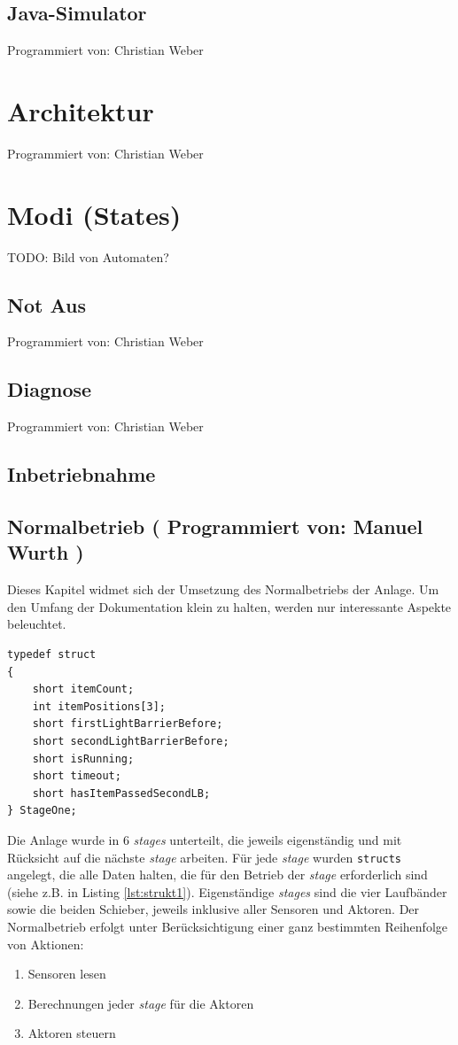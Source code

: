 \documentclass[fontsize=11pt,a4paper,final]{scrartcl}[2003/01/01]
\newcommand*{\manu}{%
	Programmiert von: Manuel Wurth
}
\newcommand*{\chris}{%
	Programmiert von: Christian Weber
}
\begin{document}
\subsection{Java-Simulator}
\chris

\section{Architektur}
\chris
\section{Modi (States)}
TODO: Bild von Automaten?
\subsection{Not Aus}
\chris
\subsection{Diagnose}
\chris

\subsection{Inbetriebnahme}
\subsection{Normalbetrieb (\manu)}
Dieses Kapitel widmet sich der Umsetzung des Normalbetriebs der Anlage. Um den Umfang der Dokumentation klein zu halten, werden nur interessante Aspekte beleuchtet.
\begin{lstlisting}[caption={Beispiel: Struct für die erste \textit{stage} (erstes Laufband)},label={lst:strukt1}]
typedef struct
{
	short itemCount;
	int itemPositions[3];
	short firstLightBarrierBefore;
	short secondLightBarrierBefore;
	short isRunning;
	short timeout;
	short hasItemPassedSecondLB;
} StageOne;
\end{lstlisting} 
Die Anlage wurde in 6 \textit{stages} unterteilt, die jeweils eigenständig und mit Rücksicht auf die nächste \textit{stage} arbeiten. Für jede \textit{stage} wurden \lstinline|structs| angelegt, die alle Daten halten, die für den Betrieb der \textit{stage} erforderlich sind (siehe z.B. in Listing \ref{lst:strukt1}). Eigenständige \textit{stages} sind die vier Laufbänder sowie die beiden Schieber, jeweils inklusive aller Sensoren und Aktoren. Der Normalbetrieb erfolgt unter Berücksichtigung einer ganz bestimmten Reihenfolge von Aktionen:
\begin{enumerate}
\item Sensoren lesen
\item Berechnungen jeder \textit{stage} für die Aktoren
\item Aktoren steuern
\end{enumerate}
\end{document}
